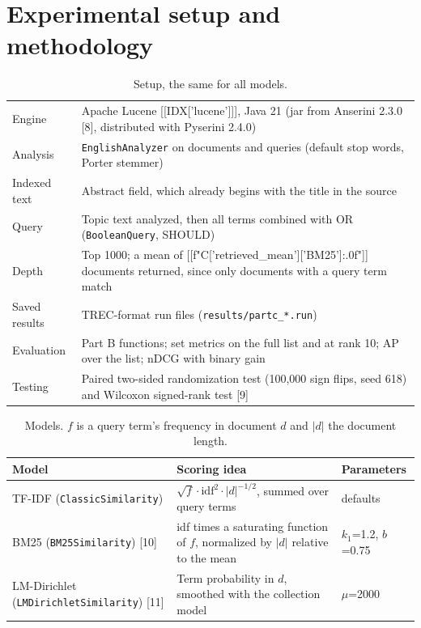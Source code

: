 \section{Experimental setup and methodology}
\begin{table}[H]\small\centering\caption{Setup, the same for all models.}
\begin{tabularx}{\linewidth}{@{}lY@{}}\toprule
Engine & Apache Lucene [[IDX['lucene']]], Java 21 (jar from Anserini 2.3.0 [8], distributed with Pyserini 2.4.0) \\
Analysis & \texttt{EnglishAnalyzer} on documents and queries (default stop words, Porter stemmer) \\
Indexed text & Abstract field, which already begins with the title in the source \\
Query & Topic text analyzed, then all terms combined with OR (\texttt{BooleanQuery}, SHOULD) \\
Depth & Top 1000; a mean of [[f"{C['retrieved_mean']['BM25']:.0f}"]] documents returned, since only documents with a query term match \\
Saved results & TREC-format run files (\texttt{results/partc\_*.run}) \\
Evaluation & Part B functions; set metrics on the full list and at rank 10; AP over the list; nDCG with binary gain \\
Testing & Paired two-sided randomization test (100,000 sign flips, seed 618) and Wilcoxon signed-rank test [9] \\
\bottomrule\end{tabularx}\end{table}
\begin{table}[H]\small\centering\caption{Models. $f$ is a query term's frequency in document $d$ and $|d|$ the document length.}
\renewcommand{\arraystretch}{1.3}
\begin{tabularx}{\linewidth}{@{}lYl@{}}\toprule
Model & Scoring idea & Parameters \\\midrule
TF-IDF (\texttt{ClassicSimilarity}) & $\sqrt{f}\cdot \mathrm{idf}^2\cdot |d|^{-1/2}$, summed over query terms & defaults \\
BM25 (\texttt{BM25Similarity}) [10] & idf times a saturating function of $f$, normalized by $|d|$ relative to the mean & $k_1$=1.2, $b$=0.75 \\
LM-Dirichlet (\texttt{LMDirichletSimilarity}) [11] & Term probability in $d$, smoothed with the collection model & $\mu$=2000 \\
\bottomrule\end{tabularx}\end{table}

